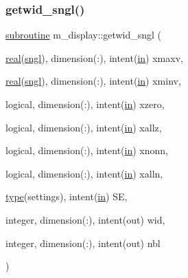 \subsubsection{\texorpdfstring{getwid\+\_\+sngl()}{getwid\_sngl()}}
{\footnotesize\ttfamily \hyperlink{M__stopwatch_83_8txt_acfbcff50169d691ff02d4a123ed70482}{subroutine} m\+\_\+display\+::getwid\+\_\+sngl (\begin{DoxyParamCaption}\item[{\hyperlink{read__watch_83_8txt_abdb62bde002f38ef75f810d3a905a823}{real}(\hyperlink{namespacem__display_a2ac86bc535c3ccc5947dbb3109c666b5}{sngl}), dimension(\+:), intent(\hyperlink{M__journal_83_8txt_afce72651d1eed785a2132bee863b2f38}{in})}]{xmaxv,  }\item[{\hyperlink{read__watch_83_8txt_abdb62bde002f38ef75f810d3a905a823}{real}(\hyperlink{namespacem__display_a2ac86bc535c3ccc5947dbb3109c666b5}{sngl}), dimension(\+:), intent(\hyperlink{M__journal_83_8txt_afce72651d1eed785a2132bee863b2f38}{in})}]{xminv,  }\item[{logical, dimension(\+:), intent(\hyperlink{M__journal_83_8txt_afce72651d1eed785a2132bee863b2f38}{in})}]{xzero,  }\item[{logical, dimension(\+:), intent(\hyperlink{M__journal_83_8txt_afce72651d1eed785a2132bee863b2f38}{in})}]{xallz,  }\item[{logical, dimension(\+:), intent(\hyperlink{M__journal_83_8txt_afce72651d1eed785a2132bee863b2f38}{in})}]{xnonn,  }\item[{logical, dimension(\+:), intent(\hyperlink{M__journal_83_8txt_afce72651d1eed785a2132bee863b2f38}{in})}]{xalln,  }\item[{\hyperlink{stop__watch_83_8txt_a70f0ead91c32e25323c03265aa302c1c}{type}(settings), intent(\hyperlink{M__journal_83_8txt_afce72651d1eed785a2132bee863b2f38}{in})}]{SE,  }\item[{integer, dimension(\+:), intent(out)}]{wid,  }\item[{integer, dimension(\+:), intent(out)}]{nbl }\end{DoxyParamCaption})\hspace{0.3cm}{\ttfamily [private]}}

\mbox{\label{namespacem__display_a803611d2a793f2a4aa7563b6c8295cb3}} 
